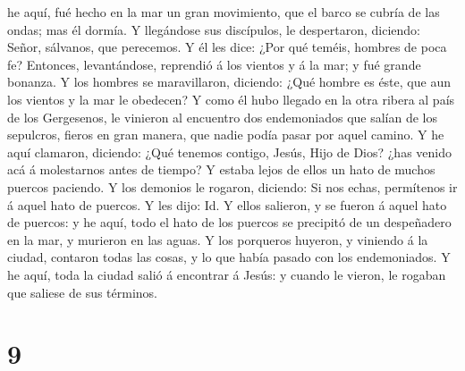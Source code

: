 he aquí, fué hecho en la mar un gran movimiento, que el barco se cubría
de las ondas; mas él dormía.  Y llegándose sus
discípulos, le despertaron, diciendo: Señor, sálvanos, que perecemos.
 Y él les dice: ¿Por qué teméis, hombres de poca fe?
Entonces, levantándose, reprendió á los vientos y á la mar; y fué grande
bonanza.  Y los hombres se maravillaron, diciendo: ¿Qué
hombre es éste, que aun los vientos y la mar le obedecen?
 Y como él hubo llegado en la otra ribera al país de los
Gergesenos, le vinieron al encuentro dos endemoniados que salían de los
sepulcros, fieros en gran manera, que nadie podía pasar por aquel
camino.  Y he aquí clamaron, diciendo: ¿Qué tenemos
contigo, Jesús, Hijo de Dios? ¿has venido acá á molestarnos antes de
tiempo?  Y estaba lejos de ellos un hato de muchos
puercos paciendo.  Y los demonios le rogaron, diciendo:
Si nos echas, permítenos ir á aquel hato de puercos.  Y
les dijo: Id. Y ellos salieron, y se fueron á aquel hato de puercos: y
he aquí, todo el hato de los puercos se precipitó de un despeñadero en
la mar, y murieron en las aguas.  Y los porqueros
huyeron, y viniendo á la ciudad, contaron todas las cosas, y lo que
había pasado con los endemoniados.  Y he aquí, toda la
ciudad salió á encontrar á Jesús: y cuando le vieron, le rogaban que
saliese de sus términos.

\hypertarget{section-8}{%
\section{9}\label{section-8}}

